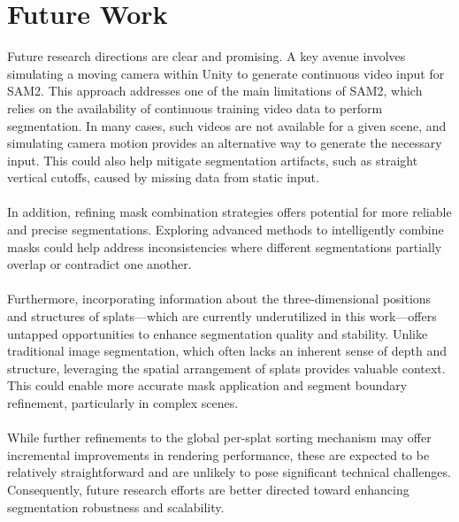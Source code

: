 \documentclass[12pt]{article}
\begin{document}
\section{Future Work}
Future research directions are clear and promising. A key avenue involves simulating a moving camera within Unity to generate continuous video input for SAM2. This approach addresses one of the main limitations of SAM2, which relies on the availability of continuous training video data to perform segmentation. In many cases, such videos are not available for a given scene, and simulating camera motion provides an alternative way to generate the necessary input. This could also help mitigate segmentation artifacts, such as straight vertical cutoffs, caused by missing data from static input.\\\\
In addition, refining mask combination strategies offers potential for more reliable and precise segmentations. Exploring advanced methods to intelligently combine masks could help address inconsistencies where different segmentations partially overlap or contradict one another.
\\\\
Furthermore, incorporating information about the three-dimensional positions and structures of splats—which are currently underutilized in this work—offers untapped opportunities to enhance segmentation quality and stability. Unlike traditional image segmentation, which often lacks an inherent sense of depth and structure, leveraging the spatial arrangement of splats provides valuable context. This could enable more accurate mask application and segment boundary refinement, particularly in complex scenes.
\\\\
While further refinements to the global per-splat sorting mechanism may offer incremental improvements in rendering performance, these are expected to be relatively straightforward and are unlikely to pose significant technical challenges. Consequently, future research efforts are better directed toward enhancing segmentation robustness and scalability.
\end{document}
